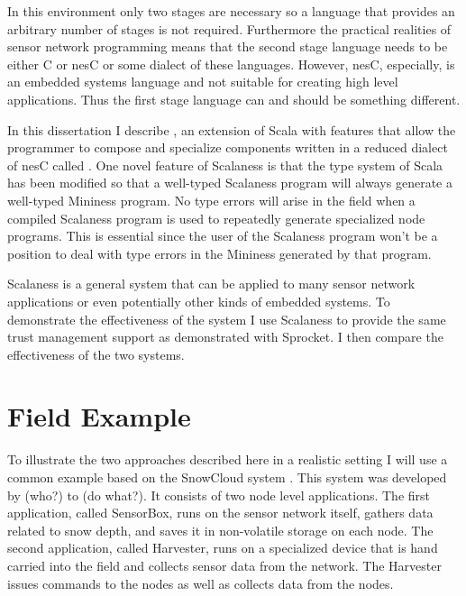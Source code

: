 In this environment only two stages are necessary so a language that provides an arbitrary
number of stages is not required. Furthermore the practical realities of sensor network
programming means that the second stage language needs to be either C or nesC or some dialect of
these languages. However, nesC, especially, is an embedded systems language and not suitable for
creating high level applications. Thus the first stage language can and should be something
different.

In this dissertation I describe , an extension of Scala \cite{PiS2} with
features that allow the programmer to compose and specialize components written in a reduced
dialect of nesC called . One novel feature of Scalaness is that the type
system of Scala has been modified so that a well-typed Scalaness program will always generate a
well-typed Mininess program. No type errors will arise in the field when a compiled Scalaness
program is used to repeatedly generate specialized node programs. This is essential since the
user of the Scalaness program won't be a position to deal with type errors in the Mininess
generated by that program.

Scalaness is a general system that can be applied to many sensor network applications or even
potentially other kinds of embedded systems. To demonstrate the effectiveness of the system I
use Scalaness to provide the same trust management support as demonstrated with Sprocket. I then
compare the effectiveness of the two systems.

\section{Field Example}

To illustrate the two approaches described here in a realistic setting I will use a common
example based on the SnowCloud system \cite{XXX}. This system was developed by (who?) to (do
what?).  It consists of two node level applications. The first application, called
SensorBox, runs on the sensor network itself, gathers data related to snow depth, and saves it
in non-volatile storage on each node. The second application, called Harvester, runs on a
specialized device that is hand carried into the field and collects sensor data from the
network. The Harvester issues commands to the nodes as well as collects data from the nodes.


